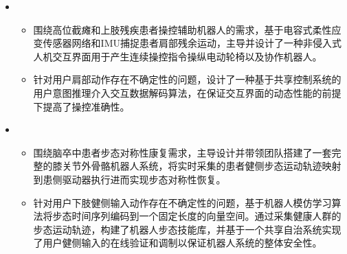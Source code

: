   \begin{itemize}[leftmargin=*]
    \item {}
    {\small
      \begin{itemize}
        \item 围绕高位截瘫和上肢残疾患者操控辅助机器人的需求，基于电容式柔性应变传感器网络和IMU捕捉患者肩部残余运动，主导并设计了一种非侵入式人机交互界面用于产生连续操控指令操纵电动轮椅以及协作机器人。
        \item 针对用户肩部动作存在不确定性的问题，设计了一种基于共享控制系统的用户意图推理介入交互数据解码算法，在保证交互界面的动态性能的前提下提高了操控准确性。
      \end{itemize}
    }

    \item {}
    {\small
    \begin{itemize}
      \item 围绕脑卒中患者步态对称性康复需求，主导设计并带领团队搭建了一套完整的膝关节外骨骼机器人系统，将实时采集的患者健侧步态运动轨迹映射到患侧驱动器执行进而实现步态对称性恢复。
      \item 针对用户下肢健侧输入动作存在不确定性的问题，基于机器人模仿学习算法将步态时间序列编码到一个固定长度的向量空间。通过采集健康人群的步态运动轨迹，构建了机器人步态技能库，并基于一个共享自治系统实现了用户健侧输入的在线验证和调制以保证机器人系统的整体安全性。
    \end{itemize}
    }


\end{itemize}
